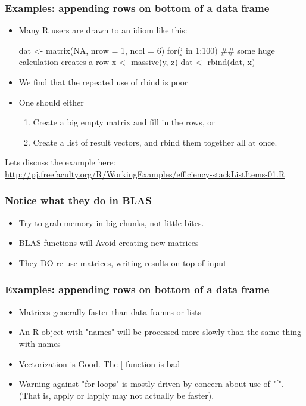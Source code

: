 \documentclass[10pt,english]{beamer}
\begin{document}
\begin{frame}
  \frametitle{Examples: appending rows on bottom of a data frame}

  \begin{itemize}
    \item Many R users are drawn to an idiom like this:
      \begin{Sinput}
dat <- matrix(NA, nrow = 1, ncol = 6)
for(j in 1:100){
    ## some huge calculation creates a row
    x <- massive(y, z)
    dat <- rbind(dat, x)
}
 \end{Sinput}
   \item We find that the repeated use of rbind is poor
   \item One should either 
     \begin{enumerate}
       \item Create a big empty matrix and fill in the rows, or
       \item Create a list of result vectors, and rbind them together
         all at once.
       \end{enumerate}
     \end{itemize}
   Lets discuss the example here: \url{http://pj.freefaculty.org/R/WorkingExamples/efficiency-stackListItems-01.R}
   
\end{frame}


\begin{frame}
  \frametitle{Notice what they do in BLAS}
  \begin{itemize}
  \item Try to grab memory in big chunks, not little bites.
    
  \item BLAS functions will Avoid creating new matrices
  \item They DO re-use matrices, writing results on top of input
  \end{itemize}
\end{frame}


\begin{frame}
  \frametitle{Examples: appending rows on bottom of a data frame}
  \begin{itemize}
  \item Matrices generally faster than data frames or lists
  \item An R object with "names" will be processed more slowly
  than the same thing with names

\item Vectorization is Good. The [ function is bad
\item Warning against "for loops" is mostly driven by concern
  about use of "[". (That is, apply or lapply may not actually
  be faster).
\end{itemize}
\end{frame}
\end{document}
